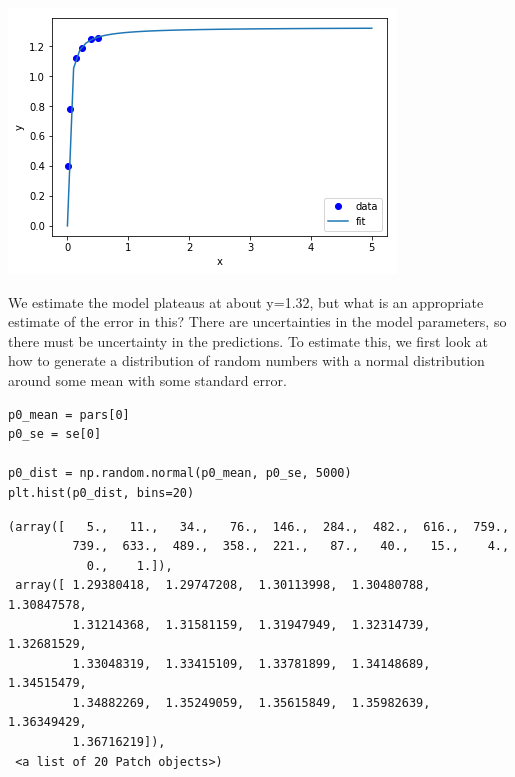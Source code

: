 \documentclass[11pt]{article}
\begin{document}
\begin{center}
\includegraphics[width=.9\linewidth]{obipy-resources/513154bd4a2746455cb8d249e9b62785-92704zes.png}
\end{center}


We estimate the model plateaus at about y=1.32, but what is an appropriate estimate of the error in this? There are uncertainties in the model parameters, so there must be uncertainty in the predictions. To estimate this, we first look at how to generate a distribution of random numbers with a normal distribution around some mean with some standard error.

\begin{verbatim}
p0_mean = pars[0]
p0_se = se[0]

p0_dist = np.random.normal(p0_mean, p0_se, 5000)
plt.hist(p0_dist, bins=20)
\end{verbatim}

\begin{verbatim}
(array([   5.,   11.,   34.,   76.,  146.,  284.,  482.,  616.,  759.,
         739.,  633.,  489.,  358.,  221.,   87.,   40.,   15.,    4.,
           0.,    1.]),
 array([ 1.29380418,  1.29747208,  1.30113998,  1.30480788,  1.30847578,
         1.31214368,  1.31581159,  1.31947949,  1.32314739,  1.32681529,
         1.33048319,  1.33415109,  1.33781899,  1.34148689,  1.34515479,
         1.34882269,  1.35249059,  1.35615849,  1.35982639,  1.36349429,
         1.36716219]),
 <a list of 20 Patch objects>)
\end{verbatim}
\end{document}
